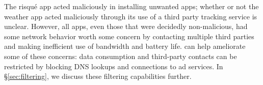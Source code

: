     The risqu\'{e} app acted maliciously in installing unwanted apps; whether or not the weather app acted maliciously through its use of a third party tracking service is unclear.
    However, all apps, even those that were decidedly non-malicious, had some network behavior worth some concern by contacting multiple third parties and making inefficient use of bandwidth and battery life.
    \meddle can help ameliorate some of these concerns: data consumption and third-party contacts can be restricted by blocking DNS lookups and connections to ad services. 
    In \S\ref{sec:filtering}, we discuss these filtering capabilities further.

